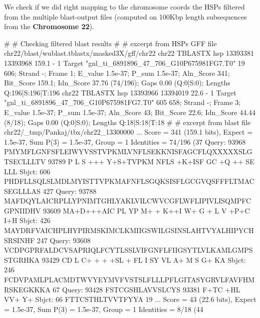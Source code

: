 \documentclass[11pt]{article}
\def\chr{\textbf{Chromosome 22}}
\begin{document}
\begin{comment}
**Problem** (from HSPs filtered by Pankaj)
From this record:
chr22_13000000 gnl|ti|9493919_44_700 101 13025701 13025621 168 248 27 18 20 3 657 3.8e-11
which is the bit-score ?
does the strand/frame pair correspond to query or to sequence ?
we have to convert to:
Hsap_BTK   TBLASTX HSP  66384 67763 1031.0 + 3 0 
\end{comment}

We check if we did right mapping to the chromosome coords the HSPs filtered from the multiple blast-output files (computed on 100Kbp length subsequences from the {\chr}).

\nwenddocs{}\plusendmoddef
#
# Checking filtered blast results
#
# excerpt from HSPs GFF file chr22/blast/wublast.tblastx/masked3X/gff/chr22
chr22 TBLASTX hsp 13393381 13393968 159.1 - 1 Target "gnl_ti_6891896_47_706_G10P675981FG7.T0" 19 606; Strand -; Frame 1; E_value 1.5e-37; P_sum 1.5e-37; Aln_Score 341; Bit_Score 159.1; Idn_Score 37.76 (74/196); Gaps 0.00 (Q:0|S:0); Lengths Q:196|S:196|T:196
chr22 TBLASTX hsp 13393966 13394019 22.6 - 1 Target  "gnl_ti_6891896_47_706_G10P675981FG7.T0" 605 658; Strand -; Frame 3; E_value 1.5e-37; P_sum 1.5e-37; Aln_Score 43; Bit_Score 22.6; Idn_Score 44.44 (8/18); Gaps 0.00 (Q:0|S:0); Lengths Q:18|S:18|T:18
#
# excerpt from blast file chr22/_tmp/Pankaj/tbx/chr22_13300000
...
 Score = 341 (159.1 bits), Expect = 1.5e-37, Sum P(3) = 1.5e-37, Group = 1
 Identities = 74/196 (37%
Query: 93968 PMYMFLGNFSFLEIWYVSSTVPKMLVNFLSEKKNISFAGCFLQXXXXXSLGTSECLLLTV 93789
             P    L   S +++ Y+S+TVPKM  NFLS +K+ISF GC +Q     ++  SE LLL
Sbjct:   606 PHDFLLSQLSLMDLMYISTTVPKMAFNFLSGQKSISFLGCGVQSFFFLTMACSEGLLLAS 427
Query: 93788 MAFDQYLAICRPLLYPNIMTGHLYAKLVILCWVCGFLWFLIPIVLISQMPFCGPNIIDHV 93609
             MA+D+++AIC PL YP  M+  +  K++I  W+ G +  L   V    +P+C    I+H
Sbjct:   426 MAYDRFVAICHPLHYPIRMSKIMCLKMIIGSWILGSINSLAHTVYALHIPYCHSRSINHF 247
Query: 93608 VCDPGPRFALDCVSAPRIQLFCYTLSSLVIFGNFLFIIGSYTLVLKAMLGMPSSTGRHKA 93429
              CD      L C+     +   +  +SL +   FL I  SY  VL A+  M S  G+ KA
Sbjct:   246 FCDVPAMLPLACMDTWVYEYMVFVSTSLFLLLPFLGITASYGRVLFAVFHMRSKEGKKKA 67
Query: 93428 FSTCGSHLAVVSLCYS 93381
             F+TC +HL VV+  Y+
Sbjct:    66 FTTCSTHLTVVTFYYA 19
...
 Score = 43 (22.6 bits), Expect = 1.5e-37, Sum P(3) = 1.5e-37, Group = 1
 Identities = 8/18 (44%
\end{document}
